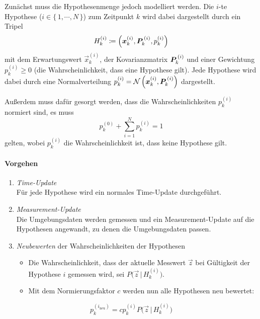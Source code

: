 				Zunächst muss die Hypothesenmenge jedoch modelliert werden. Die \(i\)-te Hypothese (\( i \in \{\, 1, \cdots, N \,\} \)) zum Zeitpunkt \(k\) wird dabei dargestellt durch ein Tripel
				\begin{equation*}
					H_k^{(i)} \coloneqq \Big( \bm{x}_k^{(i)}, \bm{P}_k^{\,(i)}, p_k^{(i)} \Big)
				\end{equation*}
				mit dem Erwartungswert \( \vec{x}_k^{(i)} \), der Kovarianzmatrix \( \bm{P}_k^{\,(i)} \) und einer Gewichtung \( p_k^{(i)} \geq 0 \) (die Wahrscheinlichkeit, dass eine Hypothese gilt). Jede Hypothese wird dabei durch eine Normalverteilung \( p_k^{(i)} = \mathcal{N}\,\Big( \bm{x}_k^{(i)}, \bm{P}_k^{\,(i)} \Big) \) dargestellt.

				Außerdem muss dafür gesorgt werden, dass die Wahrscheinlichkeiten \( p_k^{(i)} \) normiert sind, \dh es muss
				\begin{equation*}
					p_k^{(0)} + \sum_{i = 1}^{N} p_k^{(i)} = 1
				\end{equation*}
				gelten, wobei \( p_k^{(i)} \) die Wahrscheinlichkeit ist, dass keine Hypothese gilt.

				\paragraph{Vorgehen}
					\begin{enumerate}
						\item \emph{Time-Update} \\ Für jede Hypothese wird ein normales Time-Update durchgeführt.
						\item \emph{Measurement-Update} \\ Die Umgebungsdaten werden gemessen und ein Measurement-Update auf die Hypothesen angewandt, zu denen die Umgebungsdaten passen.
						\item \emph{Neubewerten} der Wahrscheinlichkeiten der Hypothesen
							\begin{itemize}
								\item Die Wahrscheinlichkeit, dass der aktuelle Messwert \( \vec{z} \) bei Gültigkeit der Hypothese \( i \) gemessen wird, sei \( P\Big(\vec{z} \,\big\vert\, H_k^{(i)}\Big) \).
								\item Mit dem Normierungsfaktor \(c\) werden nun alle Hypothesen neu bewertet:
							\end{itemize}
					\end{enumerate}
					\begin{equation*}
						p_k^{(i_\text{neu})} = c p_k^{(i)} P\Big(\vec{z} \,\big\vert\, H_k^{(i)}\Big)
					\end{equation*}

